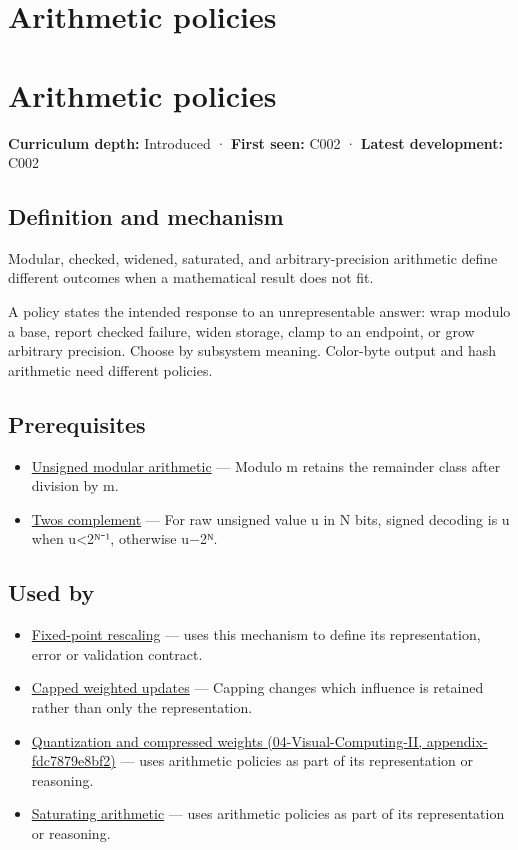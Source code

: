 \hypertarget{appendix-2ed044358b82}{}
\section*{Arithmetic policies}
\section{Arithmetic policies}\label{arithmetic-policies}

\textbf{Curriculum depth:} Introduced · \textbf{First seen:} C002 · \textbf{Latest development:} C002

\subsection{Definition and mechanism}\label{definition-and-mechanism}

Modular, checked, widened, saturated, and arbitrary-precision arithmetic define different outcomes when a mathematical result does not fit.

A policy states the intended response to an unrepresentable answer: wrap modulo a base, report checked failure, widen storage, clamp to an endpoint, or grow arbitrary precision. Choose by subsystem meaning. Color-byte output and hash arithmetic need different policies.

\subsection{Prerequisites}\label{prerequisites}

\begin{itemize}
\tightlist
\item
  \hyperref[appendix-c99977d88b33]{Unsigned modular arithmetic} --- Modulo m retains the remainder class after division by m.
\item
  \hyperref[appendix-4fbc03d20829]{Two\textquotesingle s complement} --- For raw unsigned value u in N bits, signed decoding is u when u\textless2ᴺ⁻¹, otherwise u−2ᴺ.
\end{itemize}

\subsection{Used by}\label{used-by}

\begin{itemize}
\item
  \hyperref[appendix-3333db47830f]{Fixed-point rescaling} --- uses this mechanism to define its representation, error or validation contract.
\item
  \hyperref[appendix-1e45d0613db3]{Capped weighted updates} --- Capping changes which influence is retained rather than only the representation.
\item
  \href{}{Quantization and compressed weights (04-Visual-Computing-II, appendix-fdc7879e8bf2)} --- uses arithmetic policies as part of its representation or reasoning.
\item
  \hyperref[appendix-3999c6209649]{Saturating arithmetic} --- uses arithmetic policies as part of its representation or reasoning.
\end{itemize}

